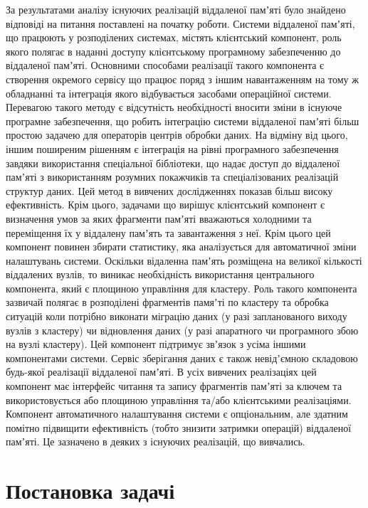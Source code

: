 За результатами аналізу існуючих реалізацій віддаленої памʼяті було знайдено відповіді на питання поставлені на початку роботи.
	Системи віддаленої памʼяті, що працюють у розподілених системах, містять клієнтський компонент, роль якого полягає в наданні доступу клієнтському програмному забезпеченню до віддаленої памʼяті. Основними способами реалізації такого компонента є створення окремого сервісу що працює поряд з іншим навантаженням на тому ж обладнанні та інтеграція якого відбувається засобами операційної системи. Перевагою такого методу є відсутність необхідності вносити зміни в існуюче програмне забезпечення, що робить інтеграцію системи віддаленої памʼяті більш простою задачею для операторів центрів обробки даних. На відміну від цього, іншим поширеним рішенням є інтеграція на рівні програмного забезпечення завдяки використання спеціальної бібліотеки, що надає доступ до віддаленої памʼяті з використанням розумних покажчиків та спеціалізованих реалізацій структур даних. Цей метод в вивчених дослідженнях показав більш високу ефективність. Крім цього, задачами що вирішує клієнтський компонент є визначення умов за яких фрагменти памʼяті вважаються холодними та переміщення їх у віддалену памʼять та завантаження з неї. Крім цього цей компонент повинен збирати статистику, яка аналізується для автоматичної зміни налаштувань системи.
	Оскільки відаленна памʼять розміщена на великої кількості віддалених вузлів, то виникає необхідність використання центрального компонента, який є площиною управління для кластеру. Роль такого компонента зазвичай полягає в розподілені фрагментів памяʼті по кластеру та обробка ситуацій коли потрібно виконати міграцію даних (у разі запланованого виходу вузлів з кластеру) чи відновлення даних (у разі апаратного чи програмного збою на вузлі кластеру). Цей компонент підтримує звʼязок з усіма іншими компонентами системи.
	Сервіс зберігання даних є також невідʼємною складовою будь-якої реалізації віддаленої памʼяті. В усіх вивчених реалізаціях цей компонент має інтерфейс читання та запису фрагментів памʼяті за ключем та використовується або площиною управління та/або клієнтськими реалізаціями.
	Компонент автоматичного налаштування системи є опціональним, але здатним помітно підвищити ефективність (тобто знизити затримки операцій) віддаленої памʼяті. Це зазначено в деяких з існуючих реалізацій, що вивчались.

\section{Постановка задачі}

